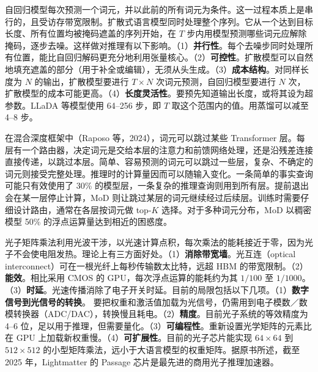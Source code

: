 \begin{interview}
自回归模型每次预测一个词元，并以此前的所有词元为条件。这一过程本质上是串行的，且受访存带宽限制。扩散式语言模型同时处理整个序列。它从一个达到目标长度、所有位置均被掩码遮盖的序列开始，在 $T$ 步内用模型预测哪些词元应解除掩码，逐步去噪。这样做对推理有以下影响。（1）\textbf{并行性}。每个去噪步同时处理所有位置，能比自回归解码更充分地利用张量核心。（2）\textbf{可控性}。扩散模型可以自然地填充遮盖的部分（用于补全或编辑），无须从头生成。（3）\textbf{成本结构}。对同样长度为 $N$ 的输出，扩散模型要进行 $T\times N$ 次词元预测，自回归模型要进行 $N$ 次，扩散模型的成本可能更高。（4）\textbf{长度灵活性}。要预先知道输出长度，或将其设为超参数。LLaDA 等模型使用 64–256 步，即 $T$ 取这个范围内的值。用蒸馏可以减至 4–8 步。

在混合深度框架中（Raposo 等，2024），词元可以跳过某些 Transformer 层。每层有一个路由器，决定词元是交给本层的注意力和前馈网络处理，还是沿残差连接直接传递，以跳过本层。简单、容易预测的词元可以跳过一些层，复杂、不确定的词元则接受完整处理。推理时的计算量因而可以随输入变化。一条简单的事实查询可能只有效使用了 30\% 的模型层，一条复杂的推理查询则用到所有层。提前退出会在某一层停止计算，MoD 则让跳过某层的词元继续经过后续层。训练时需要仔细设计路由，通常在各层按词元做 top-$K$ 选择。对于多种词元分布，MoD 以稠密模型 50\% 的浮点运算量达到相近的困惑度。

光子矩阵乘法利用光波干涉，以光速计算点积，每次乘法的能耗接近于零，因为光子不会使电阻发热。理论上有三方面好处。（1）\textbf{消除带宽墙}。光互连（optical interconnect）可在一根光纤上每秒传输数太比特，远超 HBM 的带宽限制。（2）\textbf{能效}。相比采用 CMOS 的 GPU，每次浮点运算的能耗约为其 $1/100$ 至 $1/1000$。（3）\textbf{时延}。光速传播消除了电子开关时延。目前的局限包括以下几项。（1）\textbf{数字信号到光信号的转换}。
要把权重和激活值加载为光信号，仍需用到电子模数／数模转换器（ADC/DAC），转换慢且耗电。（2）\textbf{精度}。目前光子系统的等效精度为 4–6 位，足以用于推理，但需要量化。（3）\textbf{可编程性}。重新设置光学矩阵的元素比在 GPU 上加载新权重慢。（4）\textbf{可扩展性}。目前的光子芯片能实现 $64\times64$ 到 $512\times512$ 的小型矩阵乘法，远小于大语言模型的权重矩阵。据原书所述，截至 2025 年，Lightmatter 的 Passage 芯片是最先进的商用光子推理加速器。


\end{interview}
